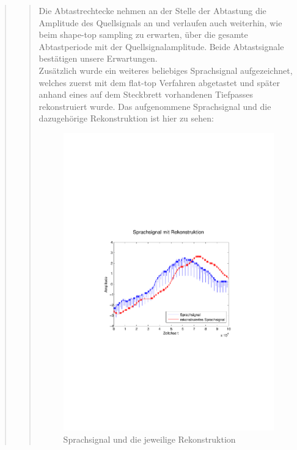 \begin{quote}
\begin{quote}
            Die Abtastrechtecke nehmen an der Stelle der Abtastung die Amplitude des
            Quellsignals an und verlaufen auch weiterhin, wie beim shape-top
            sampling zu erwarten, über die gesamte Abtastperiode mit der
            Quellsignalamplitude. Beide Abtastsignale bestätigen unsere
            Erwartungen.\\
            
            Zusätzlich wurde ein weiteres beliebiges Sprachsignal aufgezeichnet,
            welches zuerst mit dem flat-top Verfahren abgetastet und später anhand
            eines auf dem Steckbrett vorhandenen Tiefpasses rekonstruiert wurde. Das
            aufgenommene Sprachsignal und die dazugehörige Rekonstruktion ist hier
            zu sehen:
            
            \begin{figure}[H]
            \centering
            \includegraphics[scale=0.6, trim = 3.5cm 9cm 4cm 9cm,
            clip]{./Bilder/sprache+rekon}
                \caption{Sprachsignal und die jeweilige Rekonstruktion}
            \end{figure}
            
        \end{quote}  %
       	
       	
         	
    \end{quote}%
    
